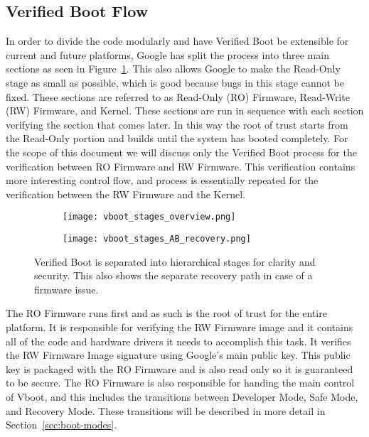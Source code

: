 \documentclass[../report.tex]{subfiles}
\begin{document}
\subsection{Verified Boot Flow}

In order to divide the code modularly and have Verified Boot be extensible for current and future platforms, Google has split the process into three main sections as seen in Figure~\ref{fig:vboot_stages_overview}.
This also allows Google to make the Read-Only stage as small as possible, which is good because bugs in this stage cannot be fixed.
These sections are referred to as Read-Only (RO) Firmware, Read-Write
(RW) Firmware, and Kernel.
These sections are run in sequence with each section verifying the section that comes later.
In this way the root of trust starts from the Read-Only portion and builds until the system has booted completely.
For the scope of this document we will discuss only the Verified Boot process for the verification between RO Firmware and RW Firmware. 
This verification contains more interesting control flow, and process is essentially repeated for the verification between the RW Firmware and the Kernel.

\begin{figure}
\begin{subfigure}{.4\textwidth}
  \centering
  \texttt{[image: vboot\_stages\_overview.png]}
\end{subfigure}
\begin{subfigure}{.60\textwidth}
  \centering
  \texttt{[image: vboot\_stages\_AB\_recovery.png]}
\end{subfigure}
\caption{Verified Boot is separated into hierarchical stages for clarity and security. This also shows the separate recovery path in case of a firmware issue.}
\label{fig:vboot_stages_overview}
\end{figure}

The RO Firmware runs first and as such is the root of trust for the entire platform.
It is responsible for verifying the RW Firmware image and it contains all of the code and hardware drivers it needs to accomplish this task.
It verifies the RW Firmware Image signature using Google's main public key.
This public key is packaged with the RO Firmware and is also read only so it is guaranteed to be secure.
The RO Firmware is also responsible for handing the main control of Vboot, and this includes the transitions between Developer Mode, Safe Mode, and Recovery Mode.
These transitions will be described in more detail in Section~\ref{sec:boot-modes}.
\end{document}

